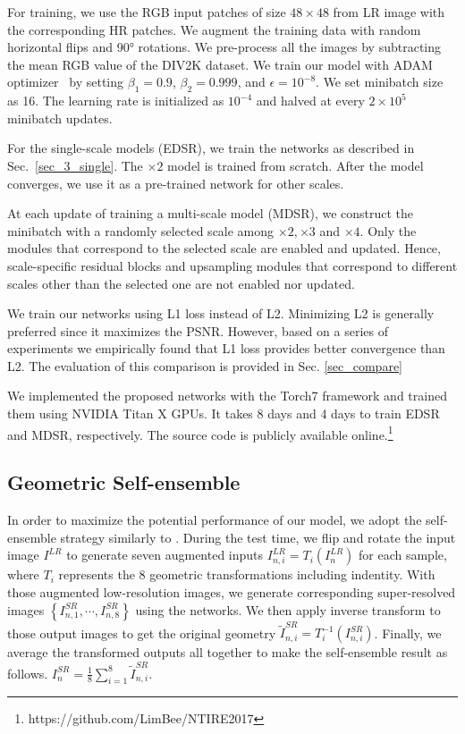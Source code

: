 \documentclass[10pt,twocolumn,letterpaper]{article}
\begin{document}
	For training, we use the RGB input patches of size $48\times 48$ from LR image with the corresponding HR patches.
	We augment the training data with random horizontal flips and 90° rotations.
	We pre-process all the images by subtracting the mean RGB value of the DIV2K dataset.
	We train our model with ADAM optimizer~\cite{kingma2014adam} by setting $\beta_1 = 0.9$, $\beta_2 = 0.999$, and $\epsilon = 10^{-8}$.
	We set minibatch size as 16.
	The learning rate is initialized as $10^{-4}$ and halved at every $2\times10^{5}$ minibatch updates.
	
	For the single-scale models (EDSR), we train the networks as described in Sec.~\ref{sec_3_single}.
	The $\times 2$ model is trained from scratch.
	After the model converges, we use it as a pre-trained network for other scales.
	
	At each update of training a multi-scale model (MDSR), we construct the minibatch with a randomly selected scale among ${\times 2, \times 3}$ and ${\times 4}$.
	Only the modules that correspond to the selected scale are enabled and updated.
	Hence, scale-specific residual blocks and upsampling modules that correspond to different scales other than the selected one are not enabled nor updated.
	
	We train our networks using L1 loss instead of L2. Minimizing L2 is generally preferred since it maximizes the PSNR. However, based on a series of experiments we empirically found that L1 loss provides better convergence than L2. The evaluation of this comparison is provided in Sec. \ref{sec_compare}
	
	We implemented the proposed networks with the Torch7 framework and trained them using NVIDIA Titan X GPUs. It takes 8 days and 4 days to train EDSR and MDSR, respectively.
	The source code is publicly available online.\footnote{https://github.com/LimBee/NTIRE2017}
	
	\subsection{Geometric Self-ensemble}
	\label{sec_ensemble}
	
	In order to maximize the potential performance of our model, we adopt the self-ensemble strategy similarly to  \cite{timofte2016seven}. During the test time, we flip and rotate the input image $I^{LR}$ to generate seven augmented inputs $I_{n,i}^{LR} = T_i \left( I_n^{LR} \right)$ for each sample, where $T_i$ represents the 8 geometric transformations including indentity.
	With those augmented low-resolution images, we generate corresponding super-resolved images $\left \{ I_{n,1}^{SR},\cdots,I_{n,8}^{SR}\right \}$ using the networks. We then apply inverse transform to those output images to get the original geometry $\tilde{I}_{n,i}^{SR} = T_i^{-1} \left( I_{n,i}^{SR} \right)$. Finally, we average the transformed outputs all together to make the self-ensemble result as follows. 
	$I_n^{SR}=\frac{1}{8} \sum \limits_{i=1}^{8} \tilde I_{n,i}^{SR}$.
	
\end{document}

